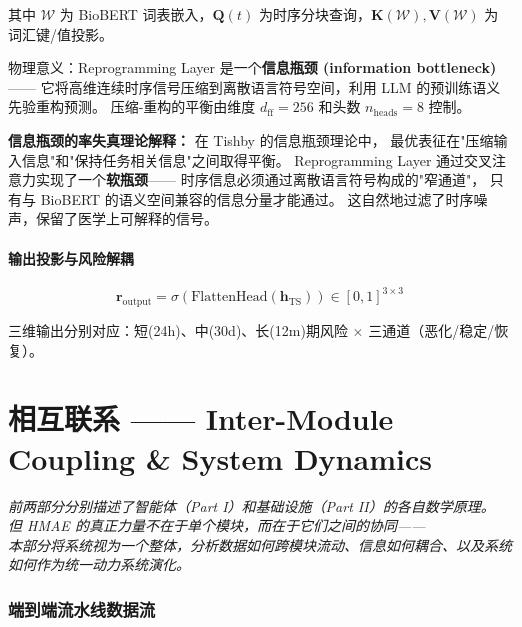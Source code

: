 \documentclass[11pt,a4paper]{ctexart}
\theoremstyle{remark}
\begin{document}
其中 $\mathcal{W}$ 为 BioBERT 词表嵌入，$\mathbf{Q}(t)$ 为时序分块查询，$\mathbf{K}(\mathcal{W}), \mathbf{V}(\mathcal{W})$ 为词汇键/值投影。

物理意义：Reprogramming Layer 是一个\textbf{信息瓶颈 (information bottleneck)} ——
它将高维连续时序信号压缩到离散语言符号空间，利用 LLM 的预训练语义先验重构预测。
压缩-重构的平衡由维度 $d_{\text{ff}} = 256$ 和头数 $n_{\text{heads}} = 8$ 控制。

\textbf{信息瓶颈的率失真理论解释：} 在 Tishby 的信息瓶颈理论中，
最优表征在"压缩输入信息"和"保持任务相关信息"之间取得平衡。
Reprogramming Layer 通过交叉注意力实现了一个\textbf{软瓶颈}——
时序信息必须通过离散语言符号构成的"窄通道"，
只有与 BioBERT 的语义空间兼容的信息分量才能通过。
这自然地过滤了时序噪声，保留了医学上可解释的信号。

\subsection{输出投影与风险解耦}

\begin{equation}
\mathbf{r}_{\text{output}} = \sigma\left(\text{FlattenHead}(\mathbf{h}_{\text{TS}})\right) \in [0,1]^{3 \times 3}
\end{equation}

三维输出分别对应：短(24h)、中(30d)、长(12m)期风险 $\times$ 三通道（恶化/稳定/恢复）。

\part{相互联系 —— Inter-Module Coupling \& System Dynamics}

\vspace{6pt}
\begin{center}
\small
\textit{前两部分分别描述了智能体（Part I）和基础设施（Part II）的各自数学原理。}\\
\textit{但 HMAE 的真正力量不在于单个模块，而在于它们之间的协同——}\\
\textit{本部分将系统视为一个整体，分析数据如何跨模块流动、信息如何耦合、以及系统如何作为统一动力系统演化。}
\end{center}
\vspace{12pt}

\section{端到端流水线数据流}
\end{document}
